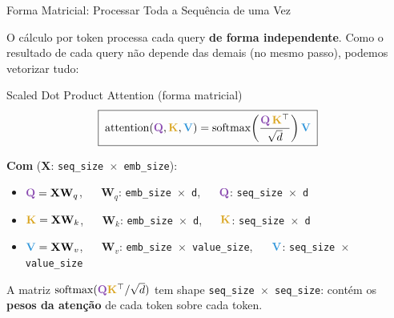 \documentclass[aspectratio=169,xcolor=dvipsnames]{beamer}
\newcommand{\Qc}{\textcolor{qcolor}{\mathbf{Q}}}
\newcommand{\Kc}{\textcolor{kcolor}{\mathbf{K}}}
\newcommand{\Vc}{\textcolor{vcolor}{\mathbf{V}}}
\begin{document}
\begin{frame}{Forma Matricial: Processar Toda a Sequência de uma Vez}

O cálculo por token processa cada query \textbf{de forma independente}. Como o resultado de cada query não depende das demais (no mesmo passo), podemos vetorizar tudo:

\vspace{4pt}

\begin{exampleblock}{Scaled Dot Product Attention (forma matricial)}
\[
\boxed{\;
\mathrm{attention}(\Qc, \Kc, \Vc) = \mathrm{softmax}\!\left(\frac{\Qc \, \Kc^{\top}}{\sqrt{d}}\right) \Vc
\;}
\]
\end{exampleblock}

\vspace{6pt}

\textbf{Com} ($\mathbf{X}$: \texttt{seq\_size $\times$ emb\_size}):
\begin{itemize}
    \item $\Qc = \mathbf{X} \mathbf{W}_q$, $\quad$ $\mathbf{W}_q$: \texttt{emb\_size $\times$ d}, $\quad$ $\Qc$: \texttt{seq\_size $\times$ d}
    \item $\Kc = \mathbf{X} \mathbf{W}_k$, $\quad$ $\mathbf{W}_k$: \texttt{emb\_size $\times$ d}, $\quad$ $\Kc$: \texttt{seq\_size $\times$ d}
    \item $\Vc = \mathbf{X} \mathbf{W}_v$, $\quad$ $\mathbf{W}_v$: \texttt{emb\_size $\times$ value\_size}, $\quad$ $\Vc$: \texttt{seq\_size $\times$ value\_size}
\end{itemize}

\vspace{4pt}

A matriz $\mathrm{softmax}(\Qc \Kc^{\top} / \sqrt{d})$ tem shape \texttt{seq\_size $\times$ seq\_size}: contém os \textbf{pesos da atenção} de cada token sobre cada token.

\end{frame}

\end{document}
